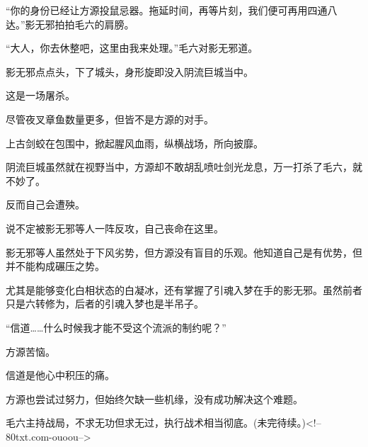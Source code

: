 \begin{this_body}
“你的身份已经让方源投鼠忌器。拖延时间，再等片刻，我们便可再用四通八达。”影无邪拍拍毛六的肩膀。

“大人，你去休整吧，这里由我来处理。”毛六对影无邪道。

影无邪点点头，下了城头，身形旋即没入阴流巨城当中。

这是一场屠杀。

尽管夜叉章鱼数量更多，但皆不是方源的对手。

上古剑蛟在包围中，掀起腥风血雨，纵横战场，所向披靡。

阴流巨城虽然就在视野当中，方源却不敢胡乱喷吐剑光龙息，万一打杀了毛六，就不妙了。

反而自己会遭殃。

说不定被影无邪等人一阵反攻，自己丧命在这里。

影无邪等人虽然处于下风劣势，但方源没有盲目的乐观。他知道自己是有优势，但并不能构成碾压之势。

尤其是能够变化白相状态的白凝冰，还有掌握了引魂入梦在手的影无邪。虽然前者只是六转修为，后者的引魂入梦也是半吊子。

“信道……什么时候我才能不受这个流派的制约呢？”

方源苦恼。

信道是他心中积压的痛。

方源也尝试过努力，但始终欠缺一些机缘，没有成功解决这个难题。

毛六主持战局，不求无功但求无过，执行战术相当彻底。(未完待续。)<!--80txt.com-ouoou-->

\end{this_body}


